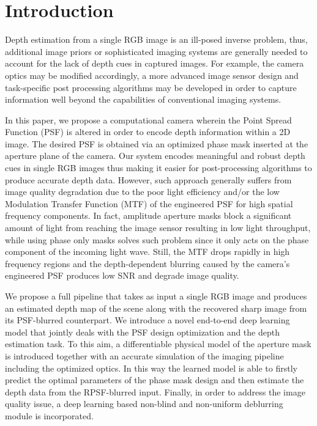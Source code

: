 \documentclass[preprint,5p,twocolumn]{elsarticle}
\begin{document}
\section{Introduction}
Depth estimation from a single RGB image is an ill-posed inverse problem, thus, additional image priors or sophisticated imaging systems are generally needed to account for the lack of depth cues in captured images. 
For example, the camera optics may be modified accordingly, a more advanced image sensor design and task-specific post processing algorithms may be developed in order to capture information well beyond the capabilities of conventional imaging systems. 


In this paper, we propose a computational camera  wherein the Point Spread Function (PSF) is altered in order to encode depth information within a 2D image. The desired PSF is obtained via an optimized phase mask inserted at the aperture plane of the camera. Our system encodes meaningful and robust depth cues in single RGB images thus making it easier for post-processing algorithms to produce accurate depth data. However, such approach generally suffers from image quality degradation due to the poor light efficiency and/or the low Modulation Transfer Function (MTF) of the engineered PSF for high spatial frequency components.
In fact, amplitude aperture masks block a significant amount of light from reaching the image sensor resulting in low light throughput, while using phase only masks solves such problem since it only acts on the phase component of the incoming light wave. Still, the MTF drops rapidly in high frequency regions and the depth-dependent blurring caused by the camera's engineered PSF produces low SNR and degrade image quality.  

We propose a full pipeline that takes as input a single RGB image  and produces an estimated depth map of the scene along with the recovered sharp image from its PSF-blurred counterpart. We introduce a novel end-to-end deep learning model that jointly deals with the PSF design optimization and the depth estimation task. To this aim, a differentiable physical model of the aperture mask is  introduced together with an accurate simulation of the imaging pipeline including the optimized optics. In this way the learned model is able to firstly predict the optimal parameters of the phase mask design and then estimate the depth data from the RPSF-blurred input.  Finally, in order to address the image quality issue, a deep learning based non-blind and non-uniform deblurring module is incorporated.
\end{document}

